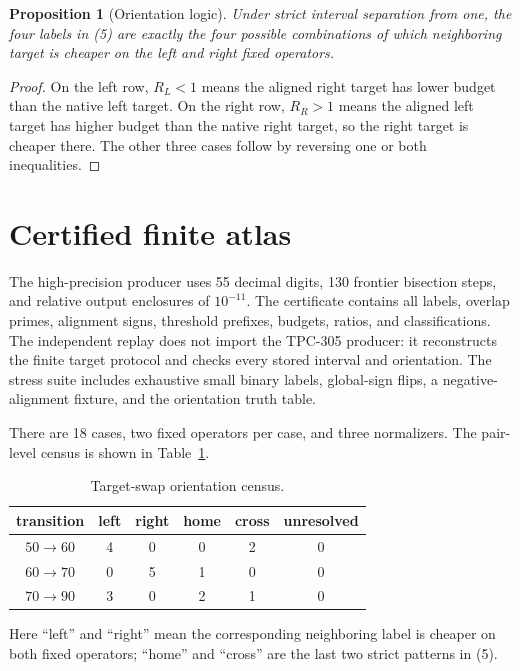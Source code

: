 \documentclass[11pt]{article}
\newtheorem{proposition}{Proposition}
\begin{document}
\begin{proposition}[Orientation logic]
Under strict interval separation from one, the four labels in (5) are exactly
the four possible combinations of which neighboring target is cheaper on the
left and right fixed operators.
\end{proposition}
\begin{proof}
On the left row, $R_L<1$ means the aligned right target has lower budget than
the native left target.  On the right row, $R_R>1$ means the aligned left
target has higher budget than the native right target, so the right target is
cheaper there.  The other three cases follow by reversing one or both
inequalities.
\end{proof}

\section{Certified finite atlas}

The high-precision producer uses 55 decimal digits, 130 frontier bisection
steps, and relative output enclosures of $10^{-11}$.  The certificate contains
all labels, overlap primes, alignment signs, threshold prefixes, budgets,
ratios, and classifications.  The independent replay does not import the
TPC-305 producer: it reconstructs the finite target protocol and checks every
stored interval and orientation.  The stress suite includes exhaustive small
binary labels, global-sign flips, a negative-alignment fixture, and the
orientation truth table.

There are 18 cases, two fixed operators per case, and three normalizers.  The
pair-level census is shown in Table~\ref{tab:pairs}.

\begin{table}[t]
\centering\small
\caption{Target-swap orientation census.}
\label{tab:pairs}
\begin{tabular}{c c c c c c}
\toprule
transition & left & right & home & cross & unresolved\\
\midrule
$50\to60$ & 4 & 0 & 0 & 2 & 0\\
$60\to70$ & 0 & 5 & 1 & 0 & 0\\
$70\to90$ & 3 & 0 & 2 & 1 & 0\\
\bottomrule
\end{tabular}
\par\smallskip
\footnotesize Here ``left'' and ``right'' mean the corresponding neighboring
label is cheaper on both fixed operators; ``home'' and ``cross'' are the last
two strict patterns in (5).
\end{table}
\end{document}
